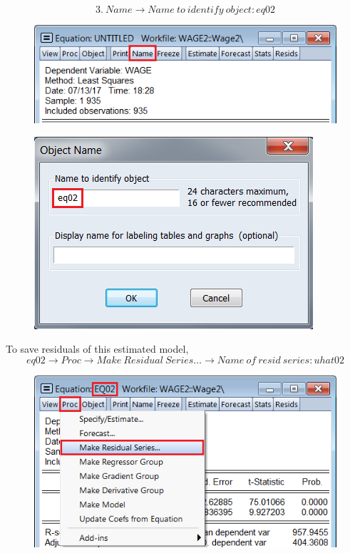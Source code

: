 \documentclass[12pt]{report}
\begin{document}
\vspace{-\baselineskip}
$$3.\ Name \to Name\ to\ identify\ object: eq02$$
\begin{figure}[H]
	\centering
	\includegraphics{q3_23}
\end{figure}
\vspace{-\baselineskip}
\begin{figure}[H]
	\centering
	\includegraphics{q3_24}
\end{figure}
\vspace{-\baselineskip}
\noindent To save residuals of this estimated model,
$$eq02 \to Proc \to Make\ Residual\ Series \dots \to Name\ of\ resid\ series: uhat02$$
\begin{figure}[H]
	\centering
	\includegraphics{q3_25}
\end{figure}
\end{document}
